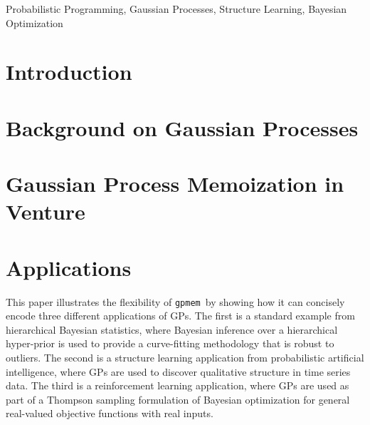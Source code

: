 \documentclass[twoside,11pt]{article}
\newcommand{\gpmem}{\texttt{gpmem}}
\newcommand{\myparagraph}[1]{\paragraph{#1}\mbox{}\\}
\begin{document}
\begin{keywords}
  Probabilistic Programming, Gaussian Processes, Structure Learning, Bayesian Optimization
\end{keywords}


\section{Introduction}

%
%

%
\setcounter{figure}{0}
\section{Background on Gaussian Processes}


%

\section{Gaussian Process Memoization in Venture}


\section{Applications}
This paper illustrates the flexibility of \gpmem\ by showing how it can concisely encode three different applications of \ac{GP}s.
The first is a standard example from hierarchical Bayesian statistics, where Bayesian inference over a hierarchical hyper-prior is used to provide a curve-fitting methodology that is robust to outliers.
The second is a structure learning application from probabilistic artificial intelligence, where \ac{GP}s are used to discover qualitative structure in time series data.
The third is a reinforcement learning application, where \ac{GP}s are used as part of a Thompson sampling formulation of Bayesian optimization for general real-valued objective functions with real inputs.
\end{document}

